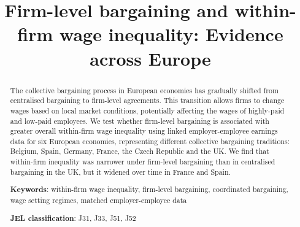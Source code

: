 \documentclass[12pt]{article}
\begin{document}
\title{Firm-level bargaining and within-firm wage inequality: Evidence across Europe}

\date{}




\maketitle

\begin{abstract}
The collective bargaining process in European economies has gradually shifted from centralised bargaining to firm-level agreements. This transition allows firms to change wages based on local market conditions, potentially affecting the wages of highly-paid and low-paid employees. We test whether firm-level bargaining is associated with greater overall within-firm wage inequality using linked employer-employee earnings data for six European economies, representing different collective bargaining traditions: Belgium, Spain, Germany, France, the Czech Republic and the UK. We find that within-firm inequality was narrower under firm-level bargaining than in centralised bargaining in the UK, but it widened over time in France and Spain.
\bigskip
 
\noindent \textbf{Keywords}: within-firm wage inequality, firm-level bargaining, coordinated bargaining, wage setting regimes, matched employer-employee data


\noindent \textbf{JEL classification}: J31, J33, J51, J52

\end{abstract}
\end{document}
